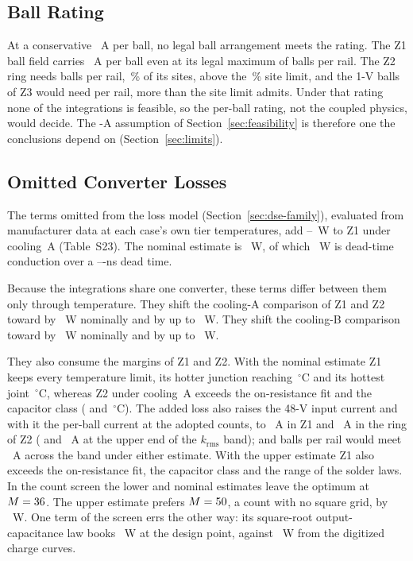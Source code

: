 \subsection{Ball Rating}\label{sec:explore-bga}
At a conservative \WrBgaRuleSens~A per ball, no legal ball arrangement meets the rating. The Z1 ball field carries
\WrBgaAtNmaxZone~A per ball even at its legal maximum of \WrBgaNmax{} balls per rail. The Z2 ring
needs \WrBgaSensNZtwo{} balls per rail, \WrBgaSensFracZtwo\,\% of its \MthSitesRing{} sites, above
the \MthLimSites\,\% site limit, and the 1-V balls of Z3 would need \BgaNsensZthree{} per rail, more
than the site limit admits. Under that rating none of the integrations is feasible, so the per-ball
rating, not the coupled physics, would decide. The \WrBgaRule-A assumption of
Section~\ref{sec:feasibility} is therefore one the conclusions depend on (Section~\ref{sec:limits}).

\subsection{Omitted Converter Losses}\label{sec:explore-omit}
The terms omitted from the loss model (Section~\ref{sec:dse-family}), evaluated from manufacturer
data at each case's own tier temperatures, add \WrOmitLo--\WrOmitHi~W to Z1 under cooling~A
(Table~S23). The
nominal estimate is \WrOmitNom~W, of which \WrOmitDead~W is dead-time conduction over a
\WrOmitDeadLo--\WrOmitDeadHi-ns dead time.

Because the integrations share one converter, these terms differ between them only through
temperature. They shift the cooling-A comparison of Z1 and Z2 toward \WrOmitFavorA{} by
\WrOmitGapA~W nominally and by up to \WrOmitGapAHi~W\WrOmitCloseA. They shift the cooling-B
comparison toward \WrOmitFavorB{} by \WrOmitGapB~W nominally and by up to \WrOmitGapBHi~W.

They also consume the margins of Z1 and Z2. With the nominal estimate Z1 keeps every temperature
limit, its hotter junction reaching \WrOmitNomRonAZone\,$^\circ$C and its hottest joint
\WrOmitNomSolderAZone\,$^\circ$C, whereas Z2 under cooling~A exceeds the on-resistance fit and the
capacitor class (\OmitNomRonFitAZtwo{} and \OmitNomMlccAZtwo\,$^\circ$C). The added loss also raises
the 48-V input current and with it the per-ball current at the adopted counts, to
\OmitNomBgaZone~A in Z1 and \OmitNomBgaZtwo~A in the ring of Z2 (\OmitNomBgaBandZone{} and
\OmitNomBgaBandZtwo~A at the upper end of the $k_{\mathrm{rms}}$ band); \OmitBgaNZone{} and
\OmitBgaNZtwo{} balls per rail would meet \WrBgaRule~A across the band under either estimate. With
the upper estimate Z1 also exceeds the on-resistance fit, the capacitor class and the range of the
solder laws. In the count screen the lower and nominal estimates leave the optimum at $M =
36$. The upper estimate prefers $M = 50$, a count with no square grid, by
\WrOmitDseMarginHi~W. One term of the screen errs the other way: its square-root output-capacitance
law books \WrCossScreen~W at the design point, against \WrCossDatasheet~W from the digitized charge
curves.

